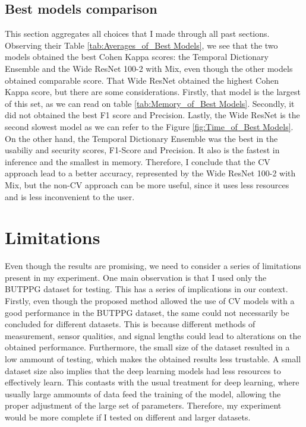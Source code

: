 




\FloatBarrier

\subsection{Best models comparison}

This section aggregates all choices that I made through all past sections. Observing their Table \ref{tab:Averages_of_Best Models}, we see that the two models obtained the best Cohen Kappa scores: the Temporal Dictionary Ensemble and the Wide ResNet 100-2 with \gls{Mix}, even though the other models obtained comparable score. That Wide ResNet obtained the highest Cohen Kappa score, but there are some considerations. Firstly, that model is the largest of this set, as we can read on table \ref{tab:Memory_of_Best Models}. Secondly, it did not obtained the best F1 score and Precision. Lastly, the Wide ResNet is the second slowest model as we can refer to the Figure \ref{fig:Time_of_Best Models}. On the other hand, the Temporal Dictionary Ensemble was the best in the usabiliy and security scores, F1-Score and Precision. It also is the fastest in inference and the smallest in memory. Therefore, I conclude that the \gls{CV} approach lead to a better accuracy, represented by the Wide ResNet 100-2 with \gls{Mix}, but the non-\gls{CV} approach can be more useful, since it uses less resources and is less inconvenient to the user.







\section{Limitations}

Even though the results are promising, we need to consider a series of limitations present in my experiment. One main observation is that I used only the BUTPPG dataset for testing. This has a series of implications in our context. Firstly, even though the proposed method allowed the use of \gls{CV} models with a good performance in the BUTPPG dataset, the same could not necessarily be concluded for different datasets. This is because different methods of measurement, sensor qualities, and signal lengths could lead to alterations on the obtained performance. Furthermore, the small size of the dataset resulted in a low ammount of testing, which makes the obtained results less trustable. A small dataset size also implies that the deep learning models had less resources to effectively learn. This contasts with the usual treatment for deep learning, where usually large ammounts of data feed the training of the model, allowing the proper adjustment of the large set of parameters. Therefore, my experiment would be more complete if I tested on different and larger datasets.

